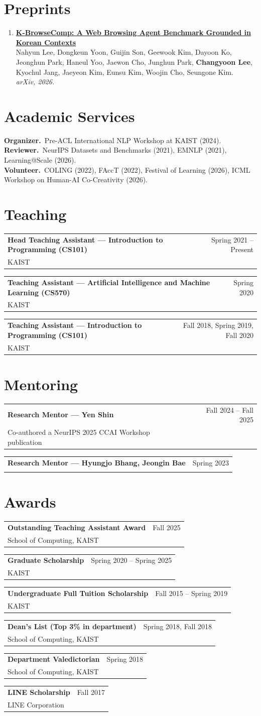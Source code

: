 \documentclass[11pt,a4paper]{article}
\makeatletter
\newcommand{\entry}[4]{%
  \begin{tabularx}{\linewidth}{@{}Xr@{}}
    \textbf{#1} & {\color{soft}\sans\small #3}\\
    {\color{soft}#2} & {\color{soft}\sans\small #4}\\
  \end{tabularx}\vspace{0.2em}%
}
\newcommand{\me}{\textbf{Changyoon Lee}}
\makeatother
\begin{document}
\section{Preprints}
\begin{enumerate}[leftmargin=1.3em,itemsep=0.5em,label=\arabic*.]
\item \href{https://arxiv.org/abs/2606.02404}{\textbf{K-BrowseComp: A Web Browsing Agent Benchmark Grounded in Korean Contexts}}\\
{\small Nahyun Lee, Dongkeun Yoon, Guijin Son, Geewook Kim, Dayoon Ko, Jeonghun Park, Haneul Yoo, Jaewon Cho, Junghun Park, \me, Kyochul Jang, Jaeyeon Kim, Eunsu Kim, Woojin Cho, Seungone Kim.}\\
{\small\color{soft}\itshape arXiv, 2026.}
\end{enumerate}

\section{Academic Services}
\textbf{Organizer.}~{\small Pre-ACL International NLP Workshop at KAIST (2024).}\\[0.3em]
\textbf{Reviewer.}~{\small NeurIPS Datasets and Benchmarks (2021), EMNLP (2021), Learning@Scale (2026).}\\[0.3em]
\textbf{Volunteer.}~{\small COLING (2022), FAccT (2022), Festival of Learning (2026), ICML Workshop on Human-AI Co-Creativity (2026).}

\section{Teaching}
\entry{Head Teaching Assistant --- Introduction to Programming (CS101)}{KAIST}{Spring 2021 -- Present}{}
\entry{Teaching Assistant --- Artificial Intelligence and Machine Learning (CS570)}{KAIST}{Spring 2020}{}
\entry{Teaching Assistant --- Introduction to Programming (CS101)}{KAIST}{Fall 2018, Spring 2019, Fall 2020}{}

\section{Mentoring}
\entry{Research Mentor --- Yen Shin}{Co-authored a NeurIPS 2025 CCAI Workshop publication}{Fall 2024 -- Fall 2025}{}
\entry{Research Mentor --- Hyungjo Bhang, Jeongin Bae}{}{Spring 2023}{}

\section{Awards}
\entry{Outstanding Teaching Assistant Award}{School of Computing, KAIST}{Fall 2025}{}
\entry{Graduate Scholarship}{KAIST}{Spring 2020 -- Spring 2025}{}
\entry{Undergraduate Full Tuition Scholarship}{KAIST}{Fall 2015 -- Spring 2019}{}
\entry{Dean's List (Top 3\% in department)}{School of Computing, KAIST}{Spring 2018, Fall 2018}{}
\entry{Department Valedictorian}{School of Computing, KAIST}{Spring 2018}{}
\entry{LINE Scholarship}{LINE Corporation}{Fall 2017}{}
\end{document}
